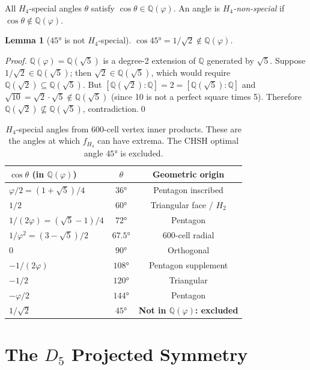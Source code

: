 \documentclass[11pt,letterpaper]{article}
\newtheorem{lemma}[theorem]{Lemma}
\newcommand{\phig}{\varphi}
\begin{document}
All $H_4$-special angles $\theta$ satisfy
$\cos\theta \in \mathbb{Q}(\phig)$.  An angle is
\emph{$H_4$-non-special} if $\cos\theta \notin \mathbb{Q}(\phig)$.

\begin{lemma}[$45°$ is not $H_4$-special]
\label{lem:45}
$\cos 45° = 1/\sqrt{2} \notin \mathbb{Q}(\phig)$.
\end{lemma}

\begin{proof}
$\mathbb{Q}(\phig) = \mathbb{Q}(\sqrt5)$ is a degree-2 extension of
$\mathbb{Q}$ generated by $\sqrt5$.  Suppose $1/\sqrt2 \in
\mathbb{Q}(\sqrt5)$; then $\sqrt2 \in \mathbb{Q}(\sqrt5)$, which
would require $\mathbb{Q}(\sqrt2) \subseteq \mathbb{Q}(\sqrt5)$.
But $[\mathbb{Q}(\sqrt2):\mathbb{Q}] = 2 = [\mathbb{Q}(\sqrt5):\mathbb{Q}]$
and $\sqrt{10} = \sqrt2\cdot\sqrt5 \notin \mathbb{Q}(\sqrt5)$ (since
10 is not a perfect square times 5).  Therefore $\mathbb{Q}(\sqrt2)
\not\subseteq \mathbb{Q}(\sqrt5)$, contradiction.\qed
\end{proof}

\begin{table}[H]
\centering
\caption{$H_4$-special angles from 600-cell vertex inner products.
  These are the angles at which $f_{H_4}$ can have extrema.
  The CHSH optimal angle $45°$ is excluded.}
\label{tab:special_angles}
\begin{tabular}{@{}lcc@{}}
\toprule
$\cos\theta$ (in $\mathbb{Q}(\phig)$) & $\theta$ & Geometric origin \\
\midrule
$\phig/2 = (1+\sqrt5)/4$ & $36°$ & Pentagon inscribed \\
$1/2$ & $60°$ & Triangular face / $H_2$ \\
$1/(2\phig) = (\sqrt5-1)/4$ & $72°$ & Pentagon \\
$1/\phig^2 = (3-\sqrt5)/2$ & $67.5°$ & 600-cell radial \\
$0$ & $90°$ & Orthogonal \\
$-1/(2\phig)$ & $108°$ & Pentagon supplement \\
$-1/2$ & $120°$ & Triangular \\
$-\phig/2$ & $144°$ & Pentagon \\
\midrule
$1/\sqrt{2}$ & $45°$ & \textbf{Not in $\mathbb{Q}(\phig)$: excluded} \\
\bottomrule
\end{tabular}
\end{table}

\section{The $D_5$ Projected Symmetry}
\end{document}
